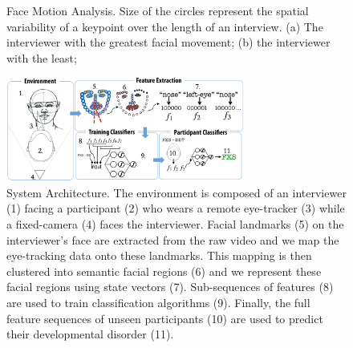 \documentclass[10pt,twocolumn,letterpaper]{article}
\begin{document}
\begin{figure}[centering]
\centering
    \caption{Face Motion Analysis. Size of the circles represent the spatial variability of a keypoint over the length of an interview. (a) The interviewer with the greatest facial movement; (b) the interviewer with the least; %
    	}
\label{fig:PERSON}
\end{figure}

\begin{figure}[ht]   
\centering
           \includegraphics[width=0.7\textwidth]{figures/system.png}           
 \caption{System Architecture. The environment is composed of an interviewer (1) facing a participant (2) who wears a remote eye-tracker (3) while a fixed-camera (4) faces the interviewer. Facial landmarks (5) on the interviewer's face are extracted from the raw video and we map the eye-tracking data onto these landmarks. This mapping is then clustered into semantic facial regions (6) and we represent these facial regions using state vectors (7). Sub-sequences of features (8) are used to train classification algorithms (9). Finally, the full feature sequences of  unseen participants (10) are used to predict their developmental disorder (11).}
\label{fig:system_architecture}
\end{figure}
\end{document}
